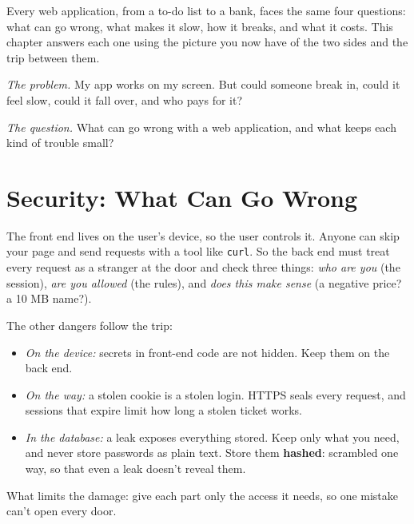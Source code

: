 
\begin{chapterintro}

Every web application, from a to-do list to a bank, faces the same four questions: what can go wrong, what makes it slow, how it breaks, and what it costs. This chapter answers each one using the picture you now have of the two sides and the trip between them.

\end{chapterintro}

\emph{The problem.} My app works on my screen. But could someone break in, could it feel slow, could it fall over, and who pays for it?

\emph{The question.} What can go wrong with a web application, and what keeps each kind of trouble small?

\section{Security: What Can Go Wrong}\label{05-security-speed-failure-cost:security-what-can-go-wrong}

The front end lives on the user's device, so the user controls it. Anyone can skip your page and send requests with a tool like \texttt{curl}. So the back end must treat every request as a stranger at the door and check three things: \emph{who are you} (the session), \emph{are you allowed} (the rules), and \emph{does this make sense} (a negative price? a 10 MB name?).

The other dangers follow the trip:

\begin{itemize}
\tightlist
\item
  \emph{On the device:} secrets in front-end code are not hidden. Keep them on the back end.
\item
  \emph{On the way:} a stolen cookie is a stolen login. HTTPS seals every request, and sessions that expire limit how long a stolen ticket works.
\item
  \emph{In the database:} a leak exposes everything stored. Keep only what you need, and never store passwords as plain text. Store them \textbf{hashed}: scrambled one way, so that even a leak doesn't reveal them.
\end{itemize}

What limits the damage: give each part only the access it needs, so one mistake can't open every door.

